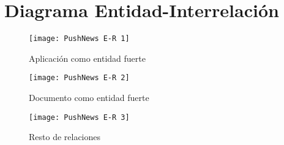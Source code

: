 \section{Diagrama Entidad-Interrelación}
\begin{figure}[h]
    \centering
    \texttt{[image: PushNews E-R 1]}
    \caption{Aplicación como entidad fuerte}
    \label{fig:diagram-entidad-interrelacion-1}
\end{figure}

\begin{figure}[h]
    \centering
    \texttt{[image: PushNews E-R 2]}
    \caption{Documento como entidad fuerte}
    \label{fig:diagram-entidad-interrelacion-2}
\end{figure}

\begin{figure}[h]
    \centering
    \texttt{[image: PushNews E-R 3]}
    \caption{Resto de relaciones}
    \label{fig:diagram-entidad-interrelacion-3}
\end{figure}